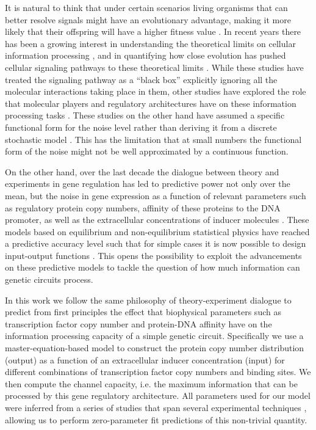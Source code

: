 It is natural to think that under certain scenarios living organisms that can
better resolve signals might have an evolutionary advantage, making it more
likely that their offspring will have a higher fitness value \cite{Taylor2007a}.
In recent years there has been a growing interest in understanding the
theoretical limits on cellular information processing \cite{Bialek2005,
Gregor2007}, and in quantifying how close evolution has pushed cellular
signaling pathways to these theoretical limits \cite{Tkacik2008, Dubuis2013,
Petkova2016}. While these studies have treated the signaling pathway as a
``black box'' explicitly ignoring all the molecular interactions taking place in
them, other studies have explored the role that molecular players and regulatory
architectures have on these information processing tasks \cite{Rieckh2014,
Ziv2007, Voliotis2014, Tostevin2009, Tkacik2011, Tkacik2008a, Tabbaa2014}. These
studies on the other hand have assumed a specific functional form for the noise
level rather than deriving it from a discrete stochastic model . This has the limitation that at small numbers the functional
form of the noise might not be well approximated by a continuous function.

On the other hand, over the last decade the dialogue between theory and
experiments in gene regulation has led to predictive power not only over the
mean, but the noise in gene expression as a function of relevant parameters such
as regulatory protein copy numbers, affinity of these proteins to the DNA
promoter, as well as the extracellular concentrations of inducer
molecules \cite{Garcia2011c, Jones2014a, Brewster2014, Razo-Mejia2018} . These models based on equilibrium and
non-equilibrium statistical physics have reached a predictive accuracy level
such that for simple cases it is now possible to design input-output functions
\cite{Brewster2012, Barnes2018}. This opens the possibility to exploit the
advancements on these predictive models to tackle the question of how much
information can genetic circuits process.

In this work we follow the same philosophy of theory-experiment dialogue to
predict from first principles the effect that biophysical parameters such as
transcription factor copy number and protein-DNA affinity have on the
information processing capacity of a simple genetic circuit. Specifically we use
a master-equation-based model to construct the protein copy number distribution
(output) as a function of an extracellular inducer concentration (input) for
different combinations of transcription factor copy numbers and binding sites.
We then compute the channel capacity, i.e. the maximum information that can be
processed by this gene regulatory architecture. All parameters used for our
model were inferred from a series of studies that span several experimental
techniques \cite{Garcia2011c, Brewster2012, Jones2014a, Brewster2014,
Razo-Mejia2018} , allowing us to
perform zero-parameter fit predictions of this non-trivial quantity.

